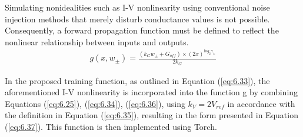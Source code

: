 \noindent Simulating nonidealities such as I-V nonlinearity using conventional noise injection methods that merely disturb conductance values is not possible. Consequently, a forward propagation function must be defined to reflect the nonlinear relationship between inputs and outputs.
\begin{align}
g(x, w_\pm) = \frac{\left( k_Gw_\pm + G_{off}\right) \times \left( 2x \right)^{log_2\gamma_\pm}}{2k_G} \label{eq:6.37}
\end{align}

\noindent In the proposed training function, as outlined in Equation (\ref{eq:6.33}), the aforementioned I-V nonlinearity is incorporated into the function g by combining Equations (\ref{eq:6.25}), (\ref{eq:6.34}), (\ref{eq:6.36}), using $k_V = 2V_{ref}$ in accordance with the definition in Equation (\ref{eq:6.35}), resulting in the form presented in Equation (\ref{eq:6.37}). This function is then implemented using Torch.\\




